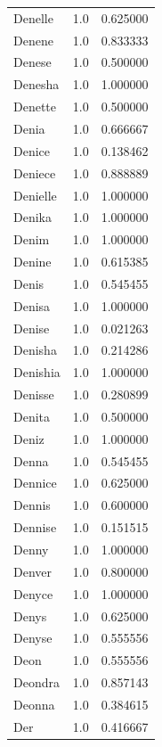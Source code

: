 \documentclass[
  letterpaper,
  DIV=11,
  numbers=noendperiod]{scrreprt}
\begin{document}
\begin{tabular}{lrr}
Denelle         &   1.0 &   0.625000 \\
Denene          &   1.0 &   0.833333 \\
Denese          &   1.0 &   0.500000 \\
Denesha         &   1.0 &   1.000000 \\
Denette         &   1.0 &   0.500000 \\
Denia           &   1.0 &   0.666667 \\
Denice          &   1.0 &   0.138462 \\
Deniece         &   1.0 &   0.888889 \\
Denielle        &   1.0 &   1.000000 \\
Denika          &   1.0 &   1.000000 \\
Denim           &   1.0 &   1.000000 \\
Denine          &   1.0 &   0.615385 \\
Denis           &   1.0 &   0.545455 \\
Denisa          &   1.0 &   1.000000 \\
Denise          &   1.0 &   0.021263 \\
Denisha         &   1.0 &   0.214286 \\
Denishia        &   1.0 &   1.000000 \\
Denisse         &   1.0 &   0.280899 \\
Denita          &   1.0 &   0.500000 \\
Deniz           &   1.0 &   1.000000 \\
Denna           &   1.0 &   0.545455 \\
Dennice         &   1.0 &   0.625000 \\
Dennis          &   1.0 &   0.600000 \\
Dennise         &   1.0 &   0.151515 \\
Denny           &   1.0 &   1.000000 \\
Denver          &   1.0 &   0.800000 \\
Denyce          &   1.0 &   1.000000 \\
Denys           &   1.0 &   0.625000 \\
Denyse          &   1.0 &   0.555556 \\
Deon            &   1.0 &   0.555556 \\
Deondra         &   1.0 &   0.857143 \\
Deonna          &   1.0 &   0.384615 \\
Der             &   1.0 &   0.416667 \\

\end{tabular}
\end{document}

